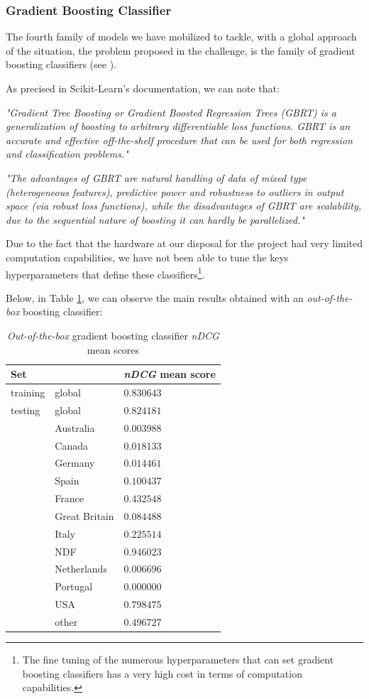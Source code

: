 \documentclass[twocolumn, switch]{article}
\begin{document}
\subsubsection{Gradient Boosting Classifier}

The fourth family of models we have mobilized to tackle, with a global approach of the situation, the problem proposed in the challenge, is the family of gradient boosting classifiers (see \cite{Breiman_1997}).

As precised in Scikit-Learn's documentation, we can note that:

\textit{"Gradient Tree Boosting or Gradient Boosted Regression Trees (GBRT) is a generalization of boosting to arbitrary differentiable loss functions. GBRT is an accurate and effective off-the-shelf procedure that can be used for both regression and classification problems."}

\textit{"The advantages of GBRT are natural handling of data of mixed type (heterogeneous features), predictive power and robustness to outliers in output space (via robust loss functions), while the disadvantages of GBRT are scalability, due to the sequential nature of boosting it can hardly be parallelized."}

Due to the fact that the hardware at our disposal for the project had very limited computation capabilities, we have not been able to tune the keys hyperparameters that define these classifiers\footnote{The fine tuning of the numerous hyperparameters that can set gradient boosting classifiers has a very high cost in terms of computation capabilities.}.

Below, in Table \ref{tab:gbc}, we can observe the main results obtained with an \textit{out-of-the-box} boosting classifier:

\begin{table}[H]
\caption{\textit{Out-of-the-box} gradient boosting classifier \textit{nDCG} mean scores}
\centering
\begin{tabular}{lll}
\toprule
Set & & \textit{nDCG} mean score \\
\midrule
training & global & $0.830643$ \\
testing & global & $0.824181$ \\
& Australia & $0.003988$ \\
& Canada & $0.018133$ \\
& Germany & $0.014461$ \\
& Spain & $0.100437$ \\
& France & $0.432548$ \\
& Great Britain & $0.084488$ \\
& Italy & $0.225514$ \\
& NDF & $0.946023$ \\
& Netherlands & $0.006696$ \\
& Portugal & $0.000000$ \\
& USA & $0.798475$ \\
& other & $0.496727$ \\
\bottomrule
\end{tabular}
\label{tab:gbc}
\end{table}
\end{document}
